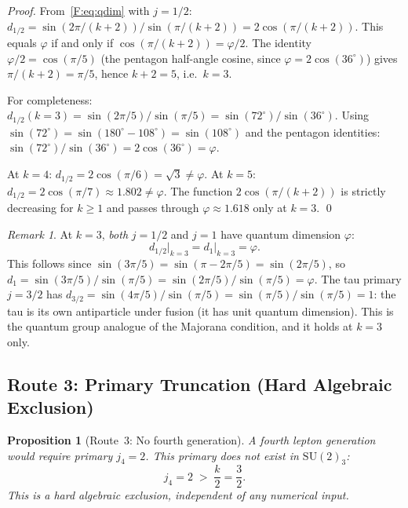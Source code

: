 \documentclass[11pt,a4paper]{article}
\newtheorem{proposition}[theorem]{Proposition}
\theoremstyle{definition}
\theoremstyle{remark}
\newtheorem{remark}[theorem]{Remark}
\newcommand{\vp}{\varphi}
\begin{document}
\begin{proof}
From~\eqref{F:eq:qdim} with $j=1/2$:
$d_{1/2} = \sin(2\pi/(k+2))/\sin(\pi/(k+2)) = 2\cos(\pi/(k+2))$.
This equals $\vp$ if and only if $\cos(\pi/(k+2)) = \vp/2$.
The identity $\vp/2 = \cos(\pi/5)$ (the pentagon half-angle cosine,
since $\vp = 2\cos(36^\circ)$) gives $\pi/(k+2) = \pi/5$, hence $k+2=5$,
i.e.\ $k=3$.

For completeness: $d_{1/2}(k=3) = \sin(2\pi/5)/\sin(\pi/5) =
\sin(72^\circ)/\sin(36^\circ)$.
Using $\sin(72^\circ) = \sin(180^\circ-108^\circ) = \sin(108^\circ)$ and
the pentagon identities:
$\sin(72^\circ)/\sin(36^\circ) = 2\cos(36^\circ) = \vp$.

At $k=4$: $d_{1/2}=2\cos(\pi/6)=\sqrt{3}\neq\vp$.
At $k=5$: $d_{1/2}=2\cos(\pi/7)\approx1.802\neq\vp$.
The function $2\cos(\pi/(k+2))$ is strictly decreasing for $k\geq1$ and
passes through $\vp\approx1.618$ only at $k=3$.
\qed
\end{proof}

\begin{remark}
\label{F:rem:both_phi}
At $k=3$, \emph{both} $j=1/2$ and $j=1$ have quantum dimension $\vp$:
\begin{equation}
  d_{1/2}\big|_{k=3}
  = d_{1}\big|_{k=3}
  = \vp.
  \label{F:eq:both_phi}
\end{equation}
This follows since $\sin(3\pi/5) = \sin(\pi - 2\pi/5) = \sin(2\pi/5)$,
so $d_1 = \sin(3\pi/5)/\sin(\pi/5) = \sin(2\pi/5)/\sin(\pi/5) = \vp$.
The tau primary $j=3/2$ has $d_{3/2} = \sin(4\pi/5)/\sin(\pi/5)
= \sin(\pi/5)/\sin(\pi/5) = 1$: the tau is its own antiparticle
under fusion (it has unit quantum dimension).
This is the quantum group analogue of the Majorana condition,
and it holds at $k=3$ only.
\end{remark}

\subsection{Route 3: Primary Truncation (Hard Algebraic Exclusion)}
\label{F:sec:route3}

\begin{proposition}[Route~3: No fourth generation]
\label{F:prop:route3}
A fourth lepton generation would require primary $j_4=2$.
This primary does not exist in $\mathrm{SU}(2)_3$:
\begin{equation}
  j_4 = 2 \;>\; \frac{k}{2} = \frac{3}{2}.
  \label{F:eq:j4_excluded}
\end{equation}
This is a hard algebraic exclusion, independent of any numerical input.
\end{proposition}
\end{document}
